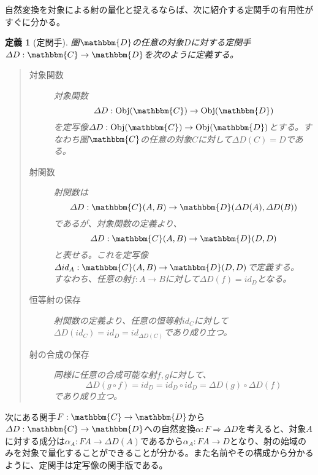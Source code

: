 \documentclass[uplatex,dvipdfmx]{jsarticle}
\newcommand{\cat}[1]{\mathbbm{#1}}
\newcommand{\arrow}{\rightarrow}
\newcommand{\functor}[3]{#1:\cat{#2}\arrow \cat{#3}}
\newcommand{\nat}[3]{#1:#2\Rightarrow #3}
\newcommand{\obj}[1]{\mathrm{Obj}(\cat{#1})}
\newcommand{\mor}[3]{#1:#2\arrow #3}
\newcommand{\arset}[3]{\cat{#1}(#2,#3)}
\newtheorem{define}{定義}[section]
\numberwithin{proof}{subsection}
\numberwithin{prop}{subsection}
\numberwithin{define}{subsection}
\begin{document}
  自然変換を対象による射の量化と捉えるならば、次に紹介する定関手の有用性がすぐに分かる。
  \begin{define}[定関手]
    圏$\cat{D}$の任意の対象$D$に対する定関手$\functor{\varDelta D}{C}{D}$を次のように定義する。
    \begin{quote}
			\begin{description}
				\item[対象関数] 対象関数\[\mor{\varDelta D}{\obj{C}}{\obj{D}}\]
				を定写像$\mor{\varDelta D}{\obj{C}}{\obj{D}}$とする。すなわち圏$\cat{C}$の任意の対象$C$に対して$\varDelta D(C)=D$である。
				\item[射関数] 
        射関数は\[\mor{\varDelta D}{\arset{C}{A}{B}}{\arset{D}{\varDelta D(A)}{\varDelta D(B)}}\]であるが、対象関数の定義より、\[\mor{\varDelta D}{\arset{C}{A}{B}}{\arset{D}{D}{D}}\]と表せる。これを定写像$\mor{\varDelta id_A}{\arset{C}{A}{B}}{\arset{D}{D}{D}}$で定義する。\\
        すなわち、任意の射$\mor{f}{A}{B}$に対して$\varDelta D (f)=id_D$となる。
				\item[恒等射の保存] 射関数の定義より、任意の恒等射$id_C$に対して$\varDelta D (id_C)=id_D=id_{\varDelta D(C)}$であり成り立つ。
				\item[射の合成の保存] 同様に任意の合成可能な射$f,g$に対して、\[\varDelta D (g\circ f)=id_D=id_D\circ id_D=\varDelta D (g)\circ \varDelta D (f)\]であり成り立つ。
			\end{description}
		\end{quote}
    \begin{center}
    \end{center}
  \end{define}
  次にある関手$\functor{F}{C}{D}$から$\functor{\varDelta D}{C}{D}$への自然変換$\nat{\alpha}{F}{\varDelta D}$を考えると、対象$A$に対する成分は$\mor{\alpha_A}{FA}{\varDelta D(A)}$であるから$\mor{\alpha_A}{FA}{D}$となり、射の始域のみを対象で量化することができることが分かる。また名前やその構成から分かるように、定関手は定写像の関手版である。
\end{document}
